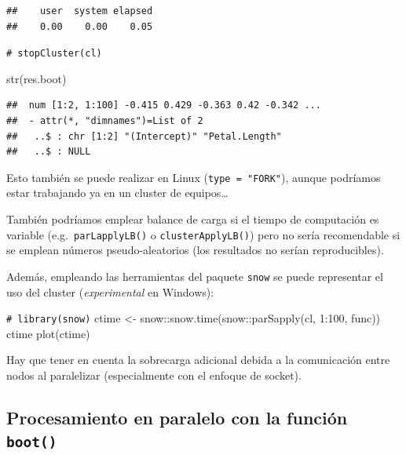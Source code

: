 \documentclass[
]{book}
\newenvironment{Shaded}{\begin{snugshade}}{\end{snugshade}}
\newcommand{\CommentTok}[1]{\textcolor[rgb]{0.56,0.35,0.01}{\textit{#1}}}
\newcommand{\DecValTok}[1]{\textcolor[rgb]{0.00,0.00,0.81}{#1}}
\newcommand{\FunctionTok}[1]{\textcolor[rgb]{0.00,0.00,0.00}{#1}}
\newcommand{\NormalTok}[1]{#1}
\newcommand{\OtherTok}[1]{\textcolor[rgb]{0.56,0.35,0.01}{#1}}
\newcommand{\SpecialCharTok}[1]{\textcolor[rgb]{0.00,0.00,0.00}{#1}}
\theoremstyle{break}
\theoremstyle{nonumberplain}
\renewcommand{\CommentTok}[1]{\textcolor[rgb]{0.41,0.41,0.41}{\texttt{#1}}}
\begin{document}
\begin{verbatim}
##    user  system elapsed 
##    0.00    0.00    0.05
\end{verbatim}

\begin{Shaded}
\begin{Highlighting}[]
\CommentTok{\# stopCluster(cl)}

\FunctionTok{str}\NormalTok{(res.boot)}
\end{Highlighting}
\end{Shaded}

\begin{verbatim}
##  num [1:2, 1:100] -0.415 0.429 -0.363 0.42 -0.342 ...
##  - attr(*, "dimnames")=List of 2
##   ..$ : chr [1:2] "(Intercept)" "Petal.Length"
##   ..$ : NULL
\end{verbatim}

Esto también se puede realizar en Linux (\texttt{type\ =\ "FORK"}), aunque podríamos estar trabajando ya en un cluster de equipos\ldots{}

También podríamos emplear balance de carga si el tiempo de computación es variable (e.g.~\texttt{parLapplyLB()} o \texttt{clusterApplyLB()}) pero no sería recomendable si se emplean números pseudo-aleatorios (los resultados no serían reproducibles).

Además, empleando las herramientas del paquete \texttt{snow} se puede representar el uso del cluster (\emph{experimental} en Windows):

\begin{Shaded}
\begin{Highlighting}[]
\CommentTok{\# library(snow)}
\NormalTok{ctime }\OtherTok{\textless{}{-}}\NormalTok{ snow}\SpecialCharTok{::}\FunctionTok{snow.time}\NormalTok{(snow}\SpecialCharTok{::}\FunctionTok{parSapply}\NormalTok{(cl, }\DecValTok{1}\SpecialCharTok{:}\DecValTok{100}\NormalTok{, func))}
\NormalTok{ctime}
\FunctionTok{plot}\NormalTok{(ctime)}
\end{Highlighting}
\end{Shaded}

Hay que tener en cuenta la sobrecarga adicional debida a la comunicación entre nodos al paralelizar (especialmente con el enfoque de socket).

\hypertarget{procesamiento-en-paralelo-con-la-funciuxf3n-boot}{%
\subsection{\texorpdfstring{Procesamiento en paralelo con la función \texttt{boot()}}{Procesamiento en paralelo con la función boot()}}\label{procesamiento-en-paralelo-con-la-funciuxf3n-boot}}
\end{document}
